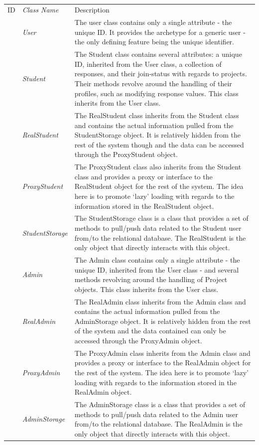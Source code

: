 \documentclass[12pt,letterpaper]{article}
\begin{document}
\begin{table}[H]
\caption{} 
\begin{tabu} to 
	\tableheader{}ID & Class Name & Description \\
	 & User & The user class contains only a single attribute - the unique ID. It provides the archetype for a generic user - the only defining feature being the unique identifier.\\
	 & Student & The Student class contains several attributes: a unique ID, inherited from the User class, a collection of responses, and their join-status with regards to projects. Their methods revolve around the handling of their profiles, such as modifying response values. This class inherits from the User class. \\
	 & RealStudent & The RealStudent class inherits from the Student class and contains the actual information pulled from the StudentStorage object. It is relatively hidden from the rest of the system though and the data can be accessed through the ProxyStudent object.\\
	 & ProxyStudent & The ProxyStudent class also inherits from the Student class and provides a proxy or interface to the RealStudent object for the rest of the system. The idea here is to promote `lazy' loading with regards to the information stored in the RealStudent object.\\
	 & StudentStorage & The StudentStorage class is a class that provides a set of methods to pull/push data related to the Student user from/to the relational database. The RealStudent is the only object that directly interacts with this object.\\
	 & Admin & The Admin class contains only a single attribute - the unique ID, inherited from the User class - and several methods revolving around the handling of Project objects. This class inherits from the User class.  \\
	 & RealAdmin & The RealAdmin class inherits from the Admin class and contains the actual information pulled from the AdminStorage object. It is relatively hidden from the rest of the system and the data contained can only be accessed through the ProxyAdmin object. \\
	 & ProxyAdmin & The ProxyAdmin class inherits from the Admin class and provides a proxy or interface to the RealAdmin object for the rest of the system. The idea here is to promote `lazy' loading with regards to the information stored in the RealAdmin object.\\
	 & AdminStorage & The AdminStorage class is a class that provides a set of methods to pull/push data related to the Admin user from/to the relational database. The RealAdmin is the only object that directly interacts with this object.\\
\end{tabu}
\end{table}
\end{document}
